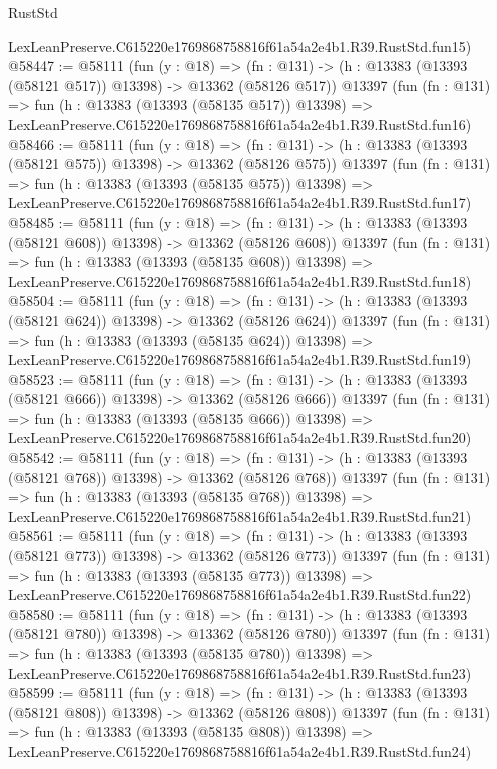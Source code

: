 \begin{lexlean}{RustStd}
\begin{coremodule}
    LexLeanPreserve.C615220e1769868758816f61a54a2e4b1.R39.RustStd.fun15)
@58447 := @58111
    (fun (y : @18) =>
    (fn : @131) -> (h : @13383 (@13393 (@58121 @517)) @13398) -> @13362 (@58126 @517))
    @13397
    (fun (fn : @131) =>
    fun (h : @13383 (@13393 (@58135 @517)) @13398) =>
    LexLeanPreserve.C615220e1769868758816f61a54a2e4b1.R39.RustStd.fun16)
@58466 := @58111
    (fun (y : @18) =>
    (fn : @131) -> (h : @13383 (@13393 (@58121 @575)) @13398) -> @13362 (@58126 @575))
    @13397
    (fun (fn : @131) =>
    fun (h : @13383 (@13393 (@58135 @575)) @13398) =>
    LexLeanPreserve.C615220e1769868758816f61a54a2e4b1.R39.RustStd.fun17)
@58485 := @58111
    (fun (y : @18) =>
    (fn : @131) -> (h : @13383 (@13393 (@58121 @608)) @13398) -> @13362 (@58126 @608))
    @13397
    (fun (fn : @131) =>
    fun (h : @13383 (@13393 (@58135 @608)) @13398) =>
    LexLeanPreserve.C615220e1769868758816f61a54a2e4b1.R39.RustStd.fun18)
@58504 := @58111
    (fun (y : @18) =>
    (fn : @131) -> (h : @13383 (@13393 (@58121 @624)) @13398) -> @13362 (@58126 @624))
    @13397
    (fun (fn : @131) =>
    fun (h : @13383 (@13393 (@58135 @624)) @13398) =>
    LexLeanPreserve.C615220e1769868758816f61a54a2e4b1.R39.RustStd.fun19)
@58523 := @58111
    (fun (y : @18) =>
    (fn : @131) -> (h : @13383 (@13393 (@58121 @666)) @13398) -> @13362 (@58126 @666))
    @13397
    (fun (fn : @131) =>
    fun (h : @13383 (@13393 (@58135 @666)) @13398) =>
    LexLeanPreserve.C615220e1769868758816f61a54a2e4b1.R39.RustStd.fun20)
@58542 := @58111
    (fun (y : @18) =>
    (fn : @131) -> (h : @13383 (@13393 (@58121 @768)) @13398) -> @13362 (@58126 @768))
    @13397
    (fun (fn : @131) =>
    fun (h : @13383 (@13393 (@58135 @768)) @13398) =>
    LexLeanPreserve.C615220e1769868758816f61a54a2e4b1.R39.RustStd.fun21)
@58561 := @58111
    (fun (y : @18) =>
    (fn : @131) -> (h : @13383 (@13393 (@58121 @773)) @13398) -> @13362 (@58126 @773))
    @13397
    (fun (fn : @131) =>
    fun (h : @13383 (@13393 (@58135 @773)) @13398) =>
    LexLeanPreserve.C615220e1769868758816f61a54a2e4b1.R39.RustStd.fun22)
@58580 := @58111
    (fun (y : @18) =>
    (fn : @131) -> (h : @13383 (@13393 (@58121 @780)) @13398) -> @13362 (@58126 @780))
    @13397
    (fun (fn : @131) =>
    fun (h : @13383 (@13393 (@58135 @780)) @13398) =>
    LexLeanPreserve.C615220e1769868758816f61a54a2e4b1.R39.RustStd.fun23)
@58599 := @58111
    (fun (y : @18) =>
    (fn : @131) -> (h : @13383 (@13393 (@58121 @808)) @13398) -> @13362 (@58126 @808))
    @13397
    (fun (fn : @131) =>
    fun (h : @13383 (@13393 (@58135 @808)) @13398) =>
    LexLeanPreserve.C615220e1769868758816f61a54a2e4b1.R39.RustStd.fun24)

\end{coremodule}
\end{lexlean}
